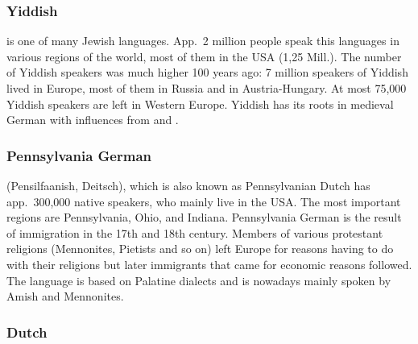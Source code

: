 


\subsubsection{Yiddish}

 is one of many Jewish languages. App.\ 2 million people speak this languages in various
regions of the world, most of them in the USA (1,25 Mill.). The number of Yiddish speakers was much
higher 100 years ago: 7 million speakers of Yiddish lived in Europe, most of them in Russia and in
Austria-Hungary. At most 75,000 Yiddish speakers are left in Western Europe. Yiddish has its roots
in medieval German with influences from  and .




\subsubsection{Pennsylvania German}

 (Pensilfaanish, Deitsch), which is also known as Pennsylvanian Dutch has app.\ 300,000
native speakers, who mainly live in the USA. The most important regions are Pennsylvania, Ohio, and
Indiana. Pennsylvania German is the result of immigration in the 17th and 18th century. Members of
various protestant religions (Mennonites, Pietists and so on) left Europe for reasons having to do
with their religions but later immigrants that came for economic reasons followed.  The language is
based on Palatine dialects and is nowadays mainly spoken by Amish and Mennonites.




\subsubsection{Dutch}

